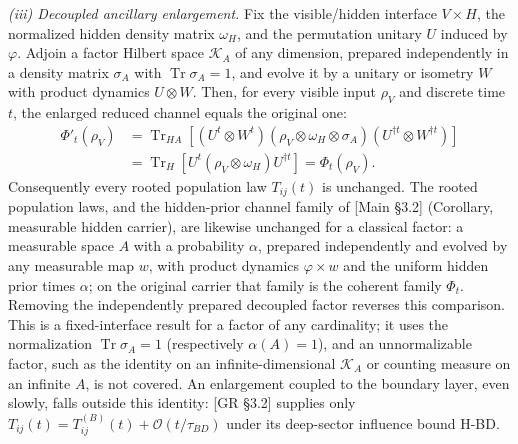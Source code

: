 \documentclass[
]{article}
\begin{document}
\emph{(iii) Decoupled ancillary enlargement.} Fix the visible/hidden
interface \(V\times H\), the normalized hidden density matrix
\(\omega_H\), and the permutation unitary \(U\) induced by \(\varphi\).
Adjoin a factor Hilbert space \(\mathcal K_A\) of any dimension,
prepared independently in a density matrix \(\sigma_A\) with
\(\operatorname{Tr}\sigma_A=1\), and evolve it by a unitary or isometry
\(W\) with product dynamics \(U\otimes W\). Then, for every visible
input \(\rho_V\) and discrete time \(t\), the enlarged reduced channel
equals the original one: \[\begin{aligned}
\Phi'_t(\rho_V)&=\operatorname{Tr}_{H A}\!\left[(U^t\otimes W^t)(\rho_V\otimes\omega_H\otimes\sigma_A)(U^{\dagger t}\otimes W^{\dagger t})\right]\\
&=\operatorname{Tr}_{H}\!\left[U^t(\rho_V\otimes\omega_H)U^{\dagger t}\right]=\Phi_t(\rho_V).
\end{aligned}\] Consequently every rooted population law \(T_{ij}(t)\)
is unchanged. The rooted population laws, and the hidden-prior channel
family of {[}Main §3.2{]} (Corollary, measurable hidden carrier), are
likewise unchanged for a classical factor: a measurable space \(A\) with
a probability \(\alpha\), prepared independently and evolved by any
measurable map \(w\), with product dynamics \(\varphi\times w\) and the
uniform hidden prior times \(\alpha\); on the original carrier that
family is the coherent family \(\Phi_t\). Removing the independently
prepared decoupled factor reverses this comparison. This is a
fixed-interface result for a factor of any cardinality; it uses the
normalization \(\operatorname{Tr}\sigma_A=1\) (respectively
\(\alpha(A)=1\)), and an unnormalizable factor, such as the identity on
an infinite-dimensional \(\mathcal K_A\) or counting measure on an
infinite \(A\), is not covered. An enlargement coupled to the boundary
layer, even slowly, falls outside this identity: {[}GR §3.2{]} supplies
only \(T_{ij}(t)=T_{ij}^{(B)}(t)+\mathcal O(t/\tau_{BD})\) under its
deep-sector influence bound H-BD.
\end{document}
